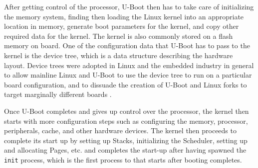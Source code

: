 \begin{figure}[h]
	\centering
\end{figure}

After getting control of the processor, U-Boot then has to take care of initializing the memory system, finding then loading the Linux kernel into an appropriate location in memory, generate boot parameters for the kernel, and copy other required data for the kernel. The kernel is also commonly stored on a flash memory on board. One of the configuration data that U-Boot has to pass to the kernel is the device tree, which is a data structure describing the hardware layout. Device trees were adopted in Linux and the embedded industry in general to allow mainline Linux and U-Boot to use the device tree to run on a particular board configuration, and to dissuade the creation of U-Boot and Linux forks to target marginally different boards \cite{device-tree}.

Once U-Boot completes and gives up control over the processor, the kernel then starts with more configuration steps such as configuring the memory, processor, peripherals, cache, and other hardware devices. The kernel then proceeds to complete its start up by setting up Stacks, initializing the Scheduler, setting up and allocating Pages, etc. and completes the start-up after having spawned the \texttt{init} process, which is the first process to that starts after booting completes.
